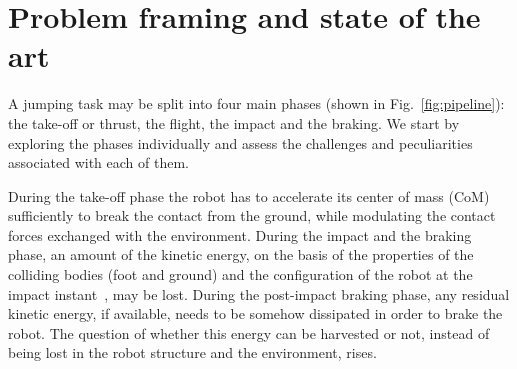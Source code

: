 \section{Problem framing and state of the art}\label{sec:prb_def}
A jumping task may be split into four main phases (shown in Fig.~\ref{fig:pipeline}): the take-off or thrust, the flight, the impact and the braking. We start by exploring the phases individually and assess the challenges and peculiarities associated with each of them.

During the take-off phase the robot has to accelerate its center of mass (CoM) sufficiently to break the contact from the ground, while modulating the contact forces exchanged with the environment.
During the impact and the braking phase, an amount of the kinetic energy, on the basis of the properties of the colliding bodies (foot and ground) and the configuration of  the robot at the impact instant~\cite{impact_dyn::walker1994impact}, may be lost.
During the post-impact braking phase, any residual kinetic energy, if available, needs to be somehow dissipated in order to brake the robot. The question of whether this energy can be harvested or not, instead of being lost in the robot structure and the environment, rises.
